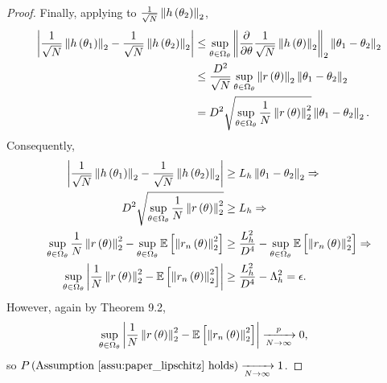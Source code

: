 \begin{proof}
Finally, applying  to $\frac{1}{\sqrt{N}}\left\Vert h\left(\theta_{2}\right)\right\Vert_{2}$,
\begin{align*}
\left|\frac{1}{\sqrt{N}}\left\Vert h\left(\theta_{1}\right)\right\Vert_{2}-\frac{1}{\sqrt{N}}\left\Vert h\left(\theta_{2}\right)\right\Vert_{2}\right| & \le\sup_{\theta\in\Omega_{\theta}}\left\Vert \frac{\partial}{\partial\theta}\frac{1}{\sqrt{N}}\left\Vert h\left(\theta\right)\right\Vert_{2}\right\Vert_{2}\left\Vert \theta_{1}-\theta_{2}\right\Vert_{2}\\
 & \le\frac{D^{2}}{\sqrt{N}}\sup_{\theta\in\Omega_{\theta}}\left\Vert r\left(\theta\right)\right\Vert_{2}\left\Vert \theta_{1}-\theta_{2}\right\Vert_{2}\\
 & =D^{2}\sqrt{\sup_{\theta\in\Omega_{\theta}}\frac{1}{N}\left\Vert r\left(\theta\right)\right\Vert_{2}^{2}}\left\Vert \theta_{1}-\theta_{2}\right\Vert_{2}.
\end{align*}
Consequently,
\begin{align*}
\left|\frac{1}{\sqrt{N}}\left\Vert h\left(\theta_{1}\right)\right\Vert_{2}-\frac{1}{\sqrt{N}}\left\Vert h\left(\theta_{2}\right)\right\Vert_{2}\right| & \ge L_{h}\left\Vert \theta_{1}-\theta_{2}\right\Vert_{2}\Rightarrow\\
D^{2}\sqrt{\sup_{\theta\in\Omega_{\theta}}\frac{1}{N}\left\Vert r\left(\theta\right)\right\Vert_{2}^{2}} & \ge L_{h}\Rightarrow\\
\sup_{\theta\in\Omega_{\theta}}\frac{1}{N}\left\Vert r\left(\theta\right)\right\Vert_{2}^{2}-\sup_{\theta\in\Omega_{\theta}}\mathbb{E}\left[\left\Vert r_{n}\left(\theta\right)\right\Vert_{2}^{2}\right] & \ge\frac{L_{h}^{2}}{D^{4}}-\sup_{\theta\in\Omega_{\theta}}\mathbb{E}\left[\left\Vert r_{n}\left(\theta\right)\right\Vert_{2}^{2}\right]\Rightarrow\\
\sup_{\theta\in\Omega_{\theta}}\left|\frac{1}{N}\left\Vert r\left(\theta\right)\right\Vert_{2}^{2}-\mathbb{E}\left[\left\Vert r_{n}\left(\theta\right)\right\Vert_{2}^{2}\right]\right| & \ge\frac{L_{h}^{2}}{D^{4}}-\Lambda_{h}^{2}=\epsilon.
\end{align*}
However, again by \citet{keener:2011:theoretical} Theorem 9.2,
\begin{align*}
\sup_{\theta\in\Omega_{\theta}}\left|\frac{1}{N}\left\Vert r\left(\theta\right)\right\Vert_{2}^{2}-\mathbb{E}\left[\left\Vert r_{n}\left(\theta\right)\right\Vert_{2}^{2}\right]\right| & \xrightarrow[N\rightarrow\infty]{p}0,
\end{align*}
so $P\left(\textrm{Assumption \ref{assu:paper_lipschitz} holds}\right)\xrightarrow[N\rightarrow\infty]{}1$.
\end{proof}

